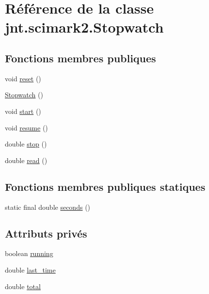 \hypertarget{classjnt_1_1scimark2_1_1Stopwatch}{\section{Référence de la classe jnt.\-scimark2.\-Stopwatch}
\label{classjnt_1_1scimark2_1_1Stopwatch}
}
\subsection*{Fonctions membres publiques}
\begin{DoxyCompactItemize}
\item 
void \hyperlink{classjnt_1_1scimark2_1_1Stopwatch_ac5442e147cb4734bb867cadeaf771cb4}{reset} ()
\item 
\hyperlink{classjnt_1_1scimark2_1_1Stopwatch_aab7050c4453e1d4578cf4e70aeddf231}{Stopwatch} ()
\item 
void \hyperlink{classjnt_1_1scimark2_1_1Stopwatch_abd9b30b3a0b8d81802aacc197a9d3237}{start} ()
\item 
void \hyperlink{classjnt_1_1scimark2_1_1Stopwatch_a6d1620c055cfb14c77aa0c559b3884bf}{resume} ()
\item 
double \hyperlink{classjnt_1_1scimark2_1_1Stopwatch_ab8958704af5479932936ba4d4fe552a1}{stop} ()
\item 
double \hyperlink{classjnt_1_1scimark2_1_1Stopwatch_a8788eccb2ccec8c62aafbf8fb1eae416}{read} ()
\end{DoxyCompactItemize}
\subsection*{Fonctions membres publiques statiques}
\begin{DoxyCompactItemize}
\item 
static final double \hyperlink{classjnt_1_1scimark2_1_1Stopwatch_ab504eef5baa37fe4d90d530623adcf40}{seconds} ()
\end{DoxyCompactItemize}
\subsection*{Attributs privés}
\begin{DoxyCompactItemize}
\item 
boolean \hyperlink{classjnt_1_1scimark2_1_1Stopwatch_a8c263f03c85291abc4d4e9c32a0083b3}{running}
\item 
double \hyperlink{classjnt_1_1scimark2_1_1Stopwatch_a73fc2c69e2ed31f72dd55ef03ef58576}{last\-\_\-time}
\item 
double \hyperlink{classjnt_1_1scimark2_1_1Stopwatch_ae3a413a0f9c0fab717d98fa5af2bcabb}{total}
\end{DoxyCompactItemize}


